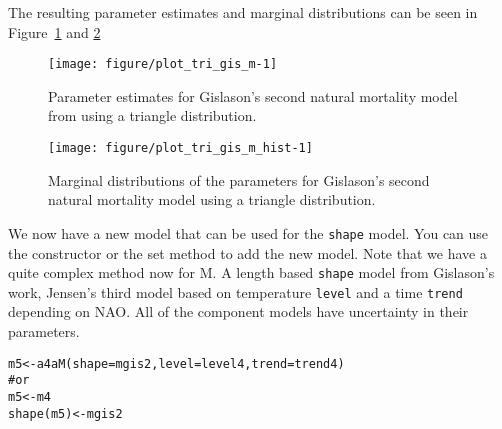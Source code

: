 \documentclass[a4paper,english,10pt]{article}\usepackage[]{graphicx}\usepackage[]{color}
\makeatletter
\def\maxwidth{ %
  \ifdim\Gin@nat@width>\linewidth
    \linewidth
  \else
    \Gin@nat@width
  \fi
}
\newcommand{\hlcom}[1]{\textcolor[rgb]{0.2,0.267,0.4}{#1}}%
\newcommand{\hlstd}[1]{\textcolor[rgb]{0,0,0}{#1}}%
\newcommand{\hlkwb}[1]{\textcolor[rgb]{0.361,0.506,0.596}{#1}}%
\newcommand{\hlkwc}[1]{\textcolor[rgb]{0.361,0.506,0.596}{#1}}%
\newcommand{\hlkwd}[1]{\textcolor[rgb]{0.361,0.506,0.596}{#1}}%
\newenvironment{kframe}{%
 \def\at@end@of@kframe{}%
 \ifinner\ifhmode%
  \def\at@end@of@kframe{\end{minipage}}%
  \begin{minipage}{\columnwidth}%
 \fi\fi%
 \def\FrameCommand##1{\hskip\@totalleftmargin \hskip-\fboxsep
 \colorbox{shadecolor}{##1}\hskip-\fboxsep
     \hskip-\linewidth \hskip-\@totalleftmargin \hskip\columnwidth}%
 \MakeFramed {\advance\hsize-\width
   \@totalleftmargin\z@ \linewidth\hsize
   \@setminipage}}%
 {\par\unskip\endMakeFramed%
 \at@end@of@kframe}
\newenvironment{knitrout}{}{} %
\newcommand{\code}[1]{{\texttt{#1}}}
\makeatother
\begin{document}
The resulting parameter estimates and marginal distributions can be seen in Figure~\ref{fig:plot_tri_gis_m} and \ref{fig:plot_tri_gis_m_hist}

\begin{knitrout}
\color{fgcolor}\begin{figure}[H]

{\centering \texttt{[image: figure/plot\_tri\_gis\_m-1]} 

}

\caption[Parameter estimates for Gislason's second natural mortality model from using a triangle distribution]{Parameter estimates for Gislason's second natural mortality model from using a triangle distribution.\label{fig:plot_tri_gis_m}}
\end{figure}


\end{knitrout}

\begin{knitrout}
\color{fgcolor}\begin{figure}[H]

{\centering \texttt{[image: figure/plot\_tri\_gis\_m\_hist-1]} 

}

\caption[Marginal distributions of the parameters for Gislason's second natural mortality model using a triangle distribution]{Marginal distributions of the parameters for Gislason's second natural mortality model using a triangle distribution.\label{fig:plot_tri_gis_m_hist}}
\end{figure}


\end{knitrout}

We now have a new model that can be used for the \code{shape} model. You can use the constructor or the set method to add the new model. Note that we have a quite complex method now for M. A length based \code{shape} model from Gislason's work, Jensen's third model based on temperature \code{level} and a time \code{trend} depending on NAO. All of the component models have uncertainty in their parameters.

\begin{knitrout}
\color{fgcolor}\begin{kframe}
\begin{alltt}
\hlstd{m5} \hlkwb{<-} \hlkwd{a4aM}\hlstd{(}\hlkwc{shape}\hlstd{=mgis2,} \hlkwc{level}\hlstd{=level4,} \hlkwc{trend}\hlstd{=trend4)}
\hlcom{# or}
\hlstd{m5} \hlkwb{<-} \hlstd{m4}
\hlkwd{shape}\hlstd{(m5)} \hlkwb{<-} \hlstd{mgis2}
\end{alltt}
\end{kframe}
\end{knitrout}
\end{document}
